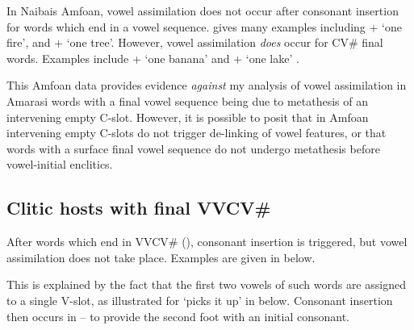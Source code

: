 In Nai{\Q}bais Amfo{\Q}an, vowel assimilation does not occur
after consonant insertion for words which end in a vowel sequence.
\citet[32]{cu18} gives many examples including
 +  {\ra}  `one fire',
and  +  {\ra}  `one tree'.
However, vowel assimilation \emph{does} occur for CV{\#} final words.
Examples include  +  {\ra}  `one banana'
and  +  {\ra}  `one lake' \citep[32]{cu18}.

This Amfo{\Q}an data provides evidence
\emph{against} my analysis of vowel assimilation in Amarasi
words with a final vowel sequence being due to
metathesis of an intervening empty C-slot.
However, it is possible to posit that in Amfo{\Q}an
intervening empty C-slots do not trigger de-linking
of vowel features, or that words with a surface
final vowel sequence do not undergo metathesis
before vowel-initial enclitics.

\subsection{Clitic hosts with final VVCV{\#}}
After words which end in VVCV{\#} (),
consonant insertion is triggered, but vowel assimilation does not take place.
Examples are given in  below.

\begin{exe}
	\label{ex2:V1V2C1V3a->V1V2C1Ca=}
\end{exe}

This is explained by the fact that the first two vowels
of such words are assigned to a single V-slot, as illustrated
for  {\ra}  `picks it up' in  below.
Consonant insertion then occurs in --
to provide the second foot with an initial consonant.

